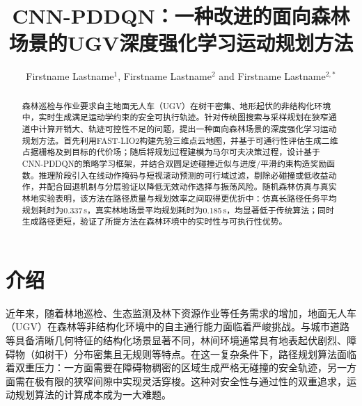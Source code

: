 \documentclass{iopjournal}
\begin{document}

\title{CNN-PDDQN：一种改进的面向森林场景的UGV深度强化学习运动规划方法}

\author{Firstname Lastname$^1$, Firstname Lastname$^2$ and Firstname Lastname$^{2,*}$}






\begin{abstract}
森林巡检与作业要求自主地面无人车（UGV）在树干密集、地形起伏的非结构化环境中，实时生成满足运动学约束的安全可执行轨迹。针对传统图搜索与采样规划在狭窄通道中计算开销大、轨迹可控性不足的问题，提出一种面向森林场景的深度强化学习运动规划方法。首先利用FAST-LIO2构建先验三维点云地图，并基于可通行性评估生成二维占据栅格及到目标的代价场；随后将规划过程建模为马尔可夫决策过程，设计基于CNN-PDDQN的策略学习框架，并结合双圆足迹碰撞近似与进度/平滑约束构造奖励函数。推理阶段引入在线动作掩码与短视滚动预测的可行域过滤，剔除必碰撞或低收益动作，并配合回退机制与分层验证以降低无效动作选择与振荡风险。随机森林仿真与真实林地实验表明，该方法在路径质量与规划效率之间取得更优折中：仿真长路径任务平均规划耗时为0.337\,s，真实林地场景平均规划耗时为0.185\,s，均显著低于传统算法；同时生成路径更短，验证了所提方法在森林环境中的实时性与可执行性优势。
\end{abstract}

\section{介绍}\label{sec:intro}

近年来，随着林地巡检、生态监测及林下资源作业等任务需求的增加，地面无人车（UGV）在森林等非结构化环境中的自主通行能力面临着严峻挑战。与城市道路等具备清晰几何特征的结构化场景显著不同，林间环境通常具有地表起伏剧烈、障碍物（如树干）分布密集且无规则等特点。在这一复杂条件下，路径规划算法面临着双重压力：一方面需要在障碍物稠密的区域生成严格无碰撞的安全轨迹，另一方面需在极有限的狭窄间隙中实现灵活穿梭。这种对安全性与通过性的双重追求，运动规划算法的计算成本成为一大难题。
\end{document}
